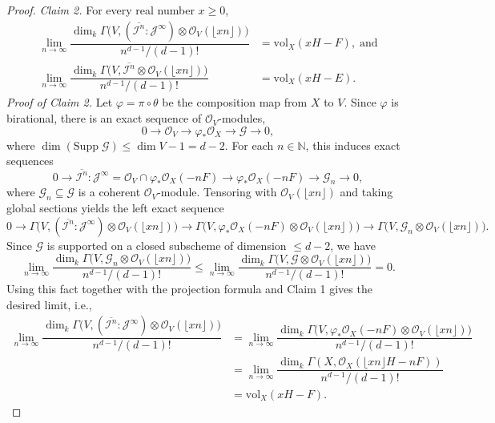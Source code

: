 \documentclass[12pt,a4paper]{amsart}
\theoremstyle{plain}
\theoremstyle{definition}
\numberwithin{equation}{theorem}
\begin{document}
\begin{proof}
\vspace{0.6em}
\noindent\textit{Claim 2.} For every real number $x\geq 0$,
\begin{align*}
 \lim_{n\to\infty}\dfrac{\dim_k \Gamma \big(V,(\overline{\mathcal{I}^n}\colon \mathcal{J}^{\infty})\otimes\mathcal{O}_V\left(\lfloor xn\rfloor\right)\big)}{n^{d-1}/(d-1)!} &= \mathrm{vol}_X(xH-F), \;\text{and}\\
 \lim_{n\to\infty}\dfrac{\dim_k \Gamma \big(V,\overline{\mathcal{I}^n}\otimes\mathcal{O}_V\left(\lfloor xn\rfloor\right)\big)}{n^{d-1}/(d-1)!} &= \mathrm{vol}_X(xH-E).
\end{align*}
\textit{Proof of Claim 2.} Let $\varphi = \pi\circ \theta $ be the composition map from $X$ to $V$. Since $\varphi$ is birational, there is an exact sequence of $\mathcal{O}_V$-modules, $$0 \to \mathcal{O}_V \to \varphi_*\mathcal{O}_X \to \mathcal{G}\to 0,$$ where $\dim \left(\mathrm{Supp}\;\mathcal{G}\right)\leq \dim V -1 = d-2$. For each $n\in\mathbb{N}$, this induces exact sequences $$0 \to \overline{\mathcal{I}^n}\colon \mathcal{J}^{\infty} = \mathcal{O}_{V} \cap \varphi_*\mathcal{O}_{X}(-nF) \to \varphi_*\mathcal{O}_{X}(-nF) \to \mathcal{G}_n \to 0,$$ where $\mathcal{G}_n \subseteq \mathcal{G}$ is a coherent $\mathcal{O}_V$-module. Tensoring with $\mathcal{O}_V\left(\lfloor xn\rfloor\right)$ and taking global sections yields the left exact sequence $$0 \to \Gamma\big(V,(\overline{\mathcal{I}^n}\colon \mathcal{J}^{\infty})\otimes\mathcal{O}_V\left(\lfloor xn\rfloor\right)\big) \to \Gamma\big(V,\varphi_*\mathcal{O}_X(-nF) \otimes \mathcal{O}_V\left(\lfloor xn\rfloor\right)\big) \to \Gamma\big(V,\mathcal{G}_n\otimes \mathcal{O}_V\left(\lfloor xn\rfloor\right)\big).$$ Since $\mathcal{G}$ is supported on a closed subscheme of dimension $\leq d-2$, we have $$\lim_{n\to\infty}\dfrac{\dim_k \Gamma\big(V,\mathcal{G}_n\otimes \mathcal{O}_V\left(\lfloor xn\rfloor\right)\big)}{n^{d-1}/(d-1)!} \leq \lim_{n\to\infty}\dfrac{\dim_k \Gamma\big(V,\mathcal{G}\otimes \mathcal{O}_V\left(\lfloor xn\rfloor\right)\big)}{n^{d-1}/(d-1)!} = 0.$$ Using this fact together with the projection formula and Claim 1 gives the desired limit, i.e.,
\begin{align*}
 \lim_{n\to\infty}\dfrac{\dim_k \Gamma \big(V,(\overline{\mathcal{I}^n}\colon \mathcal{J}^{\infty})\otimes\mathcal{O}_V\left(\lfloor xn\rfloor\right)\big)}{n^{d-1}/(d-1)!} &= \lim_{n\to\infty}\dfrac{\dim_k \Gamma \big(V,\varphi_*\mathcal{O}_{X}(-nF)\otimes\mathcal{O}_V\left(\lfloor xn\rfloor\right)\big)}{n^{d-1}/(d-1)!}\\
 &= \lim_{n\to\infty}\dfrac{\dim_k \Gamma \left(X,\mathcal{O}_X\left(\lfloor xn\rfloor H - nF\right)\right)}{n^{d-1}/(d-1)!}\\
 &= \mathrm{vol}_X(xH-F).
\end{align*}


\end{proof}
\end{document}
